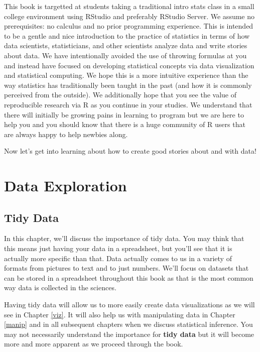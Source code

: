 \documentclass[]{tufte-book}
\begin{document}
This book is targetted at students taking a traditional intro stats
class in a small college environment using RStudio and preferably
RStudio Server. We assume no prerequisites: no calculus and no prior
programming experience. This is intended to be a gentle and nice
introduction to the practice of statistics in terms of how data
scientists, statisticians, and other scientists analyze data and write
stories about data. We have intentionally avoided the use of throwing
formulas at you and instead have focused on developing statistical
concepts via data visualization and statistical computing. We hope this
is a more intuitive experience than the way statistics has traditionally
been taught in the past (and how it is commonly perceived from the
outside). We additionally hope that you see the value of reproducible
research via R as you continue in your studies. We understand that there
will initially be growing pains in learning to program but we are here
to help you and you should know that there is a huge community of R
users that are always happy to help newbies along.

Now let's get into learning about how to create good stories about and
with data!

\part{Data Exploration}\label{part-data-exploration}

\chapter{Tidy Data}\label{tidy}

In this chapter, we'll discuss the importance of tidy data. You may
think that this means just having your data in a spreadsheet, but you'll
see that it is actually more specific than that. Data actually comes to
us in a variety of formats from pictures to text and to just numbers.
We'll focus on datasets that can be stored in a spreadsheet throughout
this book as that is the most common way data is collected in the
sciences.

Having tidy data will allow us to more easily create data visualizations
as we will see in Chapter \ref{viz}. It will also help us with
manipulating data in Chapter \ref{manip} and in all subsequent chapters
when we discuss statistical inference. You may not necessarily
understand the importance for \textbf{tidy data} but it will become more
and more apparent as we proceed through the book.
\end{document}

